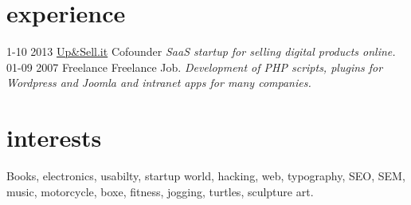 \documentclass[print]{cv}
\begin{document}
\section{experience}

\begin{entrylist}
  \entry
    {1-10 2013}
     {\href{http://www.23learn.com}{Up\&Sell.it}}
    {Cofounder}
    {\emph{SaaS startup for selling digital products online. }}
  \entry
    {01-09 2007}
    {Freelance}
    {Freelance Job.}
    {\emph{Development of PHP scripts, plugins for Wordpress and Joomla and intranet apps for many companies.}}
\end{entrylist}

\section{interests}

Books, electronics, usabilty, startup world, hacking, web, typography, SEO, SEM, music, motorcycle, boxe, fitness, jogging,
turtles, sculpture art.
\end{document}

